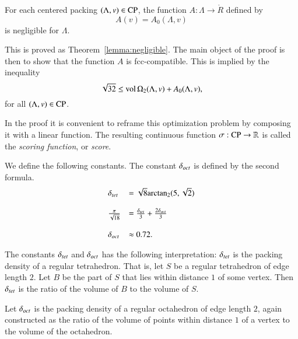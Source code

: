 \begin{theorem}\label{lemma:negligible'}
For each centered packing $(\Lambda,v)\in{\operatorname{CP}}$, the
function $A:\Lambda\to\ring{R}$ defined by
   $$A(v)= A_0(\Lambda,v)$$
is negligible for $\Lambda$.
\end{theorem}

This is proved as Theorem~\ref{lemma:negligible}.  The main object
of the proof is then to show that the function $A$ is
fcc-compatible. This is implied by the inequality
      \begin{equation}
      \sqrt{32}\le{\operatorname{vol}}\,\Omega_2(\Lambda,v)+ A_0(\Lambda,v),
      \label{eqn:32}
      \end{equation}
for all $(\Lambda,v)\in{\operatorname{CP}}$.

In the proof it is convenient to reframe this optimization problem
by composing it with a linear function.  The resulting continuous
function $\sigma:{\operatorname{CP}}\to\mathbb{R}$ is called the
  {\it scoring function}, or {\it score}.

\begin{definition}[$\dtet$,~$\doct$]\label{def:dtet}  We define the following
constants.  The constant $\doct$ is defined by the second formula.
    $$\begin{array}{lll}
      \delta_{tet} &= \sqrt{8} {\operatorname{arctan_2}}(5,\sqrt{2})\\
      \\
      \frac{\pi}{\sqrt{18}} &= \frac{\delta_{tet}}{3} + \frac{2
      \delta_{oct}}{3}\\
      \\
      \delta_{oct} & \approx 0.72.
      \end{array}
    $$
\end{definition}

\begin{remark}  The constants $\dtet$ and $\doct$ has the
following interpretation:  $\dtet$ is
the packing density of a regular tetrahedron. That is, let $S$ be
a regular tetrahedron of edge length $2$.  Let $B$ be the part of
$S$ that lies within distance $1$ of some vertex. Then $\dtet$ is
the ratio of the volume of $B$ to the volume of $S$.

Let $\doct$ is the packing density of a
regular octahedron of edge length $2$, again constructed as the
ratio of the volume of points within distance $1$ of a vertex to
the volume of the octahedron.
\end{remark}

